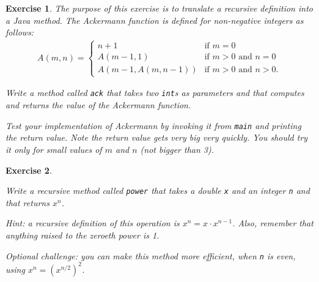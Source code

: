 \documentclass[12pt]{book}
\theoremstyle{exercise}
\newtheorem{exercise}{Exercise}[chapter]
\newcommand{\java}[1]{\verb"#1"}
\newcommand{\java}[1]{\lstinline{#1}} %
\begin{document}
\begin{exercise}

The purpose of this exercise is to translate a recursive definition into a Java method.
The Ackermann function is defined for non-negative integers as follows:
\begin{eqnarray*}
A(m, n) = \begin{cases}
              n+1 & \mbox{if } m = 0 \\
        A(m-1, 1) & \mbox{if } m > 0 \mbox{ and } n = 0 \\
A(m-1, A(m, n-1)) & \mbox{if } m > 0 \mbox{ and } n > 0.
\end{cases}
\end{eqnarray*}

Write a method called \java{ack} that takes two \java{int}s as parameters and that computes and returns the value of the Ackermann function.

Test your implementation of Ackermann by invoking it from \java{main} and printing the return value.
Note the return value gets very big very quickly.
You should try it only for small values of $m$ and $n$ (not bigger than 3).

\end{exercise}


\begin{exercise}
\label{ex.power}

Write a recursive method called \java{power} that takes a double \java{x} and an integer \java{n} and that returns $x^n$.

Hint: a recursive definition of this operation is $x^n = x \cdot x^{n-1}$.
Also, remember that anything raised to the zeroeth power is 1.

Optional challenge: you can make this method more efficient, when \java{n} is even, using $x^n = \left( x^{n/2} \right)^2$.

\end{exercise}
\end{document}
